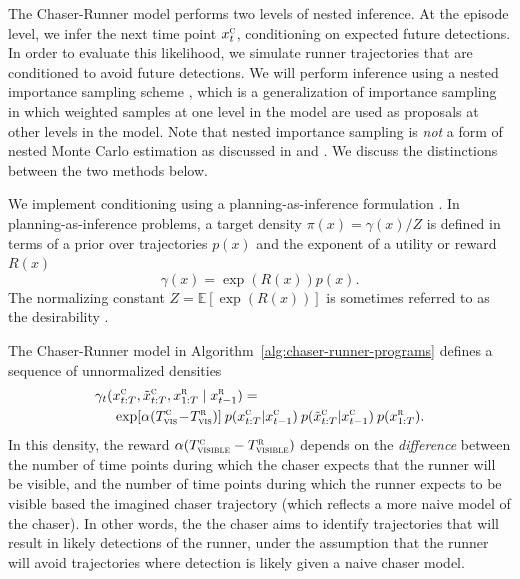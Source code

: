 \documentclass{article}
\begin{document}
The Chaser-Runner model performs two levels of nested inference. At the episode level, we infer the next time point $x^\textsc{c}_t$, conditioning on expected future detections. In order to evaluate this likelihood, we simulate runner trajectories that are conditioned to avoid future detections. We will perform inference using a nested importance sampling scheme \cite{naesseth2015nested}, which is a generalization of importance sampling in which weighted samples at one level in the model are used as proposals at other levels in the model. Note that nested importance sampling is \emph{not} a form of nested Monte Carlo estimation as discussed in \citet{rainforth2018nesting} and \citet{rainforth2018nestingb}. We discuss the distinctions between the two methods below.


We implement conditioning using a planning-as-inference formulation \cite{toussaint06,vandemeent2016black-box}. 
In planning-as-inference problems, a target density $\pi(x) = \gamma(x) / Z$ is defined in terms of a prior over trajectories $p(x)$ and the exponent of a utility or reward $R(x)$
\begin{equation}
    \gamma(x) = \exp(R(x)) p(x).
\end{equation}
The normalizing constant $Z = \mathbb{E}[\exp(R(x))]$ is sometimes referred to as the desirability \cite{todorov2009efficient}. 

The Chaser-Runner model in Algorithm~\ref{alg:chaser-runner-programs} defines a sequence of unnormalized densities 
\begin{align*}
    &\gamma_t(x^\textsc{c}_{t:T}, \tilde{x}^\textsc{c}_{t:T}, x^\textsc{r}_{1:T} \mid x^\textsc{r}_{t-1}) =
    \\
    &~~~~
    \exp[\alpha (T^\textsc{c}_\textsc{vis} \!-\! T^\textsc{r}_\textsc{vis} )] 
    \:
    p(x^\textsc{c}_{t:T} | x^\textsc{c}_{t-1})
    \:
    p(\tilde{x}^\textsc{c}_{t:T} | x^\textsc{c}_{t-1})
    \:
    p(x^\textsc{r}_{1:T}).
\end{align*}
In this density, the reward $\alpha (T^\textsc{c}_\textsc{visible} - T^\textsc{r}_\textsc{visible})$ depends on the \emph{difference} between the number of time points during which the chaser expects that the runner will be visible, and the number of time points during which the runner expects to be visible based the imagined chaser trajectory (which reflects a more naive model of the chaser). In other words, the the chaser aims to identify trajectories that will result in likely detections of the runner, under the assumption that the runner will avoid trajectories where detection is likely given a naive chaser model. 
\end{document}

